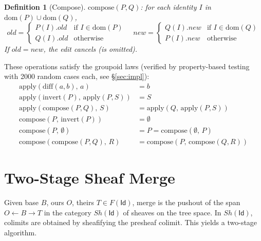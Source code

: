 \documentclass[11pt,a4paper]{article}
\newtheorem{definition}[theorem]{Definition}
\newcommand{\Id}{\mathsf{Id}}
\begin{document}
\begin{definition}[Compose]
$\mathrm{compose}(P, Q)$: for each identity $I$ in $\mathrm{dom}(P) \cup \mathrm{dom}(Q)$,
\[
old = \begin{cases} P(I).old & \text{if } I \in \mathrm{dom}(P) \\ Q(I).old & \text{otherwise} \end{cases}
\quad
new = \begin{cases} Q(I).new & \text{if } I \in \mathrm{dom}(Q) \\ P(I).new & \text{otherwise} \end{cases}
\]
If $old = new$, the edit cancels (is omitted).
\end{definition}

These operations satisfy the groupoid laws (verified by property-based
testing with 2000 random cases each, see \S\ref{sec:impl}):
\begin{align}
\mathrm{apply}(\mathrm{diff}(a,b),\, a) &= b \label{eq:roundtrip}\\
\mathrm{apply}(\mathrm{invert}(P),\, \mathrm{apply}(P, S)) &= S \label{eq:invert}\\
\mathrm{apply}(\mathrm{compose}(P, Q),\, S) &= \mathrm{apply}(Q,\, \mathrm{apply}(P, S)) \label{eq:compose}\\
\mathrm{compose}(P,\, \mathrm{invert}(P)) &= \emptyset \label{eq:cancel}\\
\mathrm{compose}(P,\, \emptyset) &= P = \mathrm{compose}(\emptyset,\, P) \label{eq:identity}\\
\mathrm{compose}(\mathrm{compose}(P, Q),\, R) &= \mathrm{compose}(P,\, \mathrm{compose}(Q, R)) \label{eq:assoc}
\end{align}


\section{Two-Stage Sheaf Merge}
\label{sec:merge}

Given base $B$, ours $O$, theirs $T \in F(\Id)$, merge is the pushout of
the span $O \leftarrow B \rightarrow T$ in the category $Sh(\Id)$ of sheaves
on the tree space. In $Sh(\Id)$, colimits are obtained by sheafifying the
presheaf colimit. This yields a two-stage algorithm.
\end{document}
